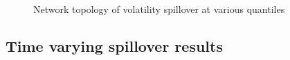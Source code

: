 \documentclass[
  letterpaper,
  DIV=11,
  numbers=noendperiod]{scrartcl}
\begin{document}
\begin{figure}[H]
\begin{minipage}[t]{0.50\linewidth}
{{}

}

\end{minipage}%
\newline
\begin{minipage}[t]{\linewidth}

{\centering 


}

\end{minipage}%

\caption{\label{fig-vol}Network topology of volatility spillover at
various quantiles}

\end{figure}

\hypertarget{time-varying-spillover-results}{%
\subsection{Time varying spillover
results}\label{time-varying-spillover-results}}
\end{document}
